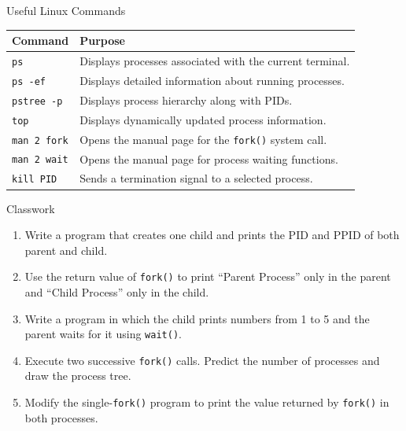 \documentclass[aspectratio=169]{beamer}
\begin{document}
\begin{frame}{Useful Linux Commands}

\begin{center}
\begin{tabular}{|p{3.2cm}|p{7.8cm}|}
\hline
\textbf{Command} & \textbf{Purpose} \\
\hline
\texttt{ps} & Displays processes associated with the current terminal. \\
\hline
\texttt{ps -ef} & Displays detailed information about running processes. \\
\hline
\texttt{pstree -p} & Displays process hierarchy along with PIDs. \\
\hline
\texttt{top} & Displays dynamically updated process information. \\
\hline
\texttt{man 2 fork} & Opens the manual page for the \texttt{fork()} system call. \\
\hline
\texttt{man 2 wait} & Opens the manual page for process waiting functions. \\
\hline
\texttt{kill PID} & Sends a termination signal to a selected process. \\
\hline
\end{tabular}
\end{center}

\end{frame}

\begin{frame}{Classwork}

\begin{enumerate}
    \item Write a program that creates one child and prints the PID and PPID of
    both parent and child.

    \item Use the return value of \texttt{fork()} to print ``Parent Process'' only
    in the parent and ``Child Process'' only in the child.

    \item Write a program in which the child prints numbers from 1 to 5 and the
    parent waits for it using \texttt{wait()}.

    \item Execute two successive \texttt{fork()} calls. Predict the number of
    processes and draw the process tree.

    \item Modify the single-\texttt{fork()} program to print the value returned by
    \texttt{fork()} in both processes.
\end{enumerate}

\end{frame}
\end{document}

